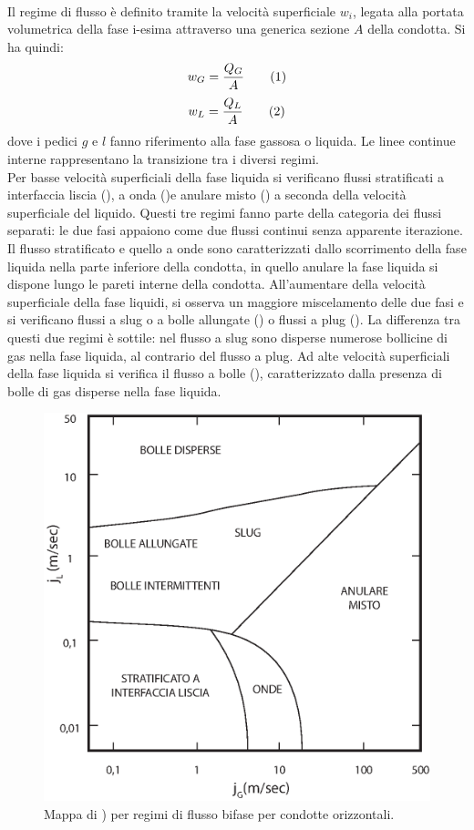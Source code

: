 \paragraph{\textcite{griffith1984multiphase}}
Il regime di flusso è definito tramite la velocità superficiale \(w_i\), legata alla portata volumetrica della fase i-esima attraverso una generica sezione \(A\) della condotta. Si ha quindi:
\[w_G = \frac{Q_G}{A} \addtag\]
\[w_L = \frac{Q_L}{A} \addtag\]
dove i pedici \(g\) e \(l\) fanno riferimento alla fase gassosa o liquida. Le linee continue interne rappresentano la transizione tra i diversi regimi.\\
Per basse velocità superficiali della fase liquida si verificano flussi stratificati a interfaccia liscia (), a onda ()e anulare misto () a seconda della velocità superficiale del liquido. Questi tre regimi fanno parte della categoria dei flussi separati: le due fasi appaiono come due flussi continui senza apparente iterazione. Il flusso stratificato e quello a onde sono caratterizzati dallo scorrimento della fase liquida nella parte inferiore della condotta, in quello anulare la fase liquida si dispone lungo le pareti interne della condotta. All'aumentare della velocità superficiale della fase liquidi, si osserva un maggiore miscelamento delle due fasi e si verificano  flussi a slug o a bolle allungate () o flussi a plug (). La differenza tra questi due regimi è sottile: nel flusso a slug sono disperse numerose bollicine di gas nella fase liquida, al contrario del flusso a plug. Ad alte velocità superficiali della fase liquida si verifica il flusso a bolle (), caratterizzato dalla presenza di bolle di gas disperse nella fase liquida.
\begin{figure}[htbp]
    \centering
    \includegraphics[width=.6\textwidth]{fig/fluidodinamica/hor-griffith.eps}
    \caption{Mappa di \textcite{griffith1984multiphase}) per regimi di flusso bifase per condotte orizzontali.}
    \label{fig:hor-griffith}
\end{figure}

